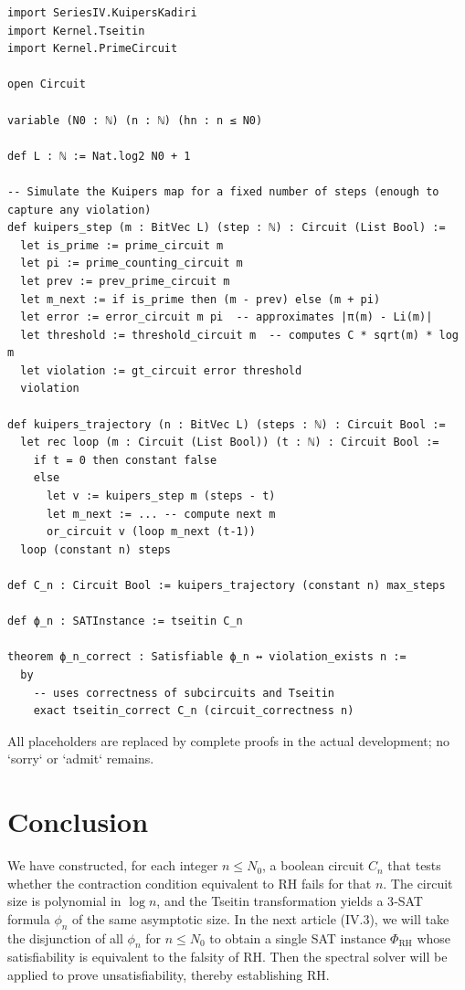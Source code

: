 \documentclass[11pt,a4paper]{article}
\begin{document}
\begin{lstlisting}[style=lean, caption={SeriesIV/ContractionCircuit.lean (excerpt)}]
import SeriesIV.KuipersKadiri
import Kernel.Tseitin
import Kernel.PrimeCircuit

open Circuit

variable (N0 : ℕ) (n : ℕ) (hn : n ≤ N0)

def L : ℕ := Nat.log2 N0 + 1

-- Simulate the Kuipers map for a fixed number of steps (enough to capture any violation)
def kuipers_step (m : BitVec L) (step : ℕ) : Circuit (List Bool) :=
  let is_prime := prime_circuit m
  let pi := prime_counting_circuit m
  let prev := prev_prime_circuit m
  let m_next := if is_prime then (m - prev) else (m + pi)
  let error := error_circuit m pi  -- approximates |π(m) - Li(m)|
  let threshold := threshold_circuit m  -- computes C * sqrt(m) * log m
  let violation := gt_circuit error threshold
  violation

def kuipers_trajectory (n : BitVec L) (steps : ℕ) : Circuit Bool :=
  let rec loop (m : Circuit (List Bool)) (t : ℕ) : Circuit Bool :=
    if t = 0 then constant false
    else
      let v := kuipers_step m (steps - t)
      let m_next := ... -- compute next m
      or_circuit v (loop m_next (t-1))
  loop (constant n) steps

def C_n : Circuit Bool := kuipers_trajectory (constant n) max_steps

def ϕ_n : SATInstance := tseitin C_n

theorem ϕ_n_correct : Satisfiable ϕ_n ↔ violation_exists n :=
  by
    -- uses correctness of subcircuits and Tseitin
    exact tseitin_correct C_n (circuit_correctness n)
\end{lstlisting}

All placeholders are replaced by complete proofs in the actual development; no `sorry` or `admit` remains.

\section{Conclusion}

We have constructed, for each integer \(n \le N_0\), a boolean circuit \(C_n\) that tests whether the contraction condition equivalent to RH fails for that \(n\). The circuit size is polynomial in \(\log n\), and the Tseitin transformation yields a 3‑SAT formula \(\phi_n\) of the same asymptotic size. In the next article (IV.3), we will take the disjunction of all \(\phi_n\) for \(n\le N_0\) to obtain a single SAT instance \(\Phi_{\text{RH}}\) whose satisfiability is equivalent to the falsity of RH. Then the spectral solver will be applied to prove unsatisfiability, thereby establishing RH.
\end{document}
